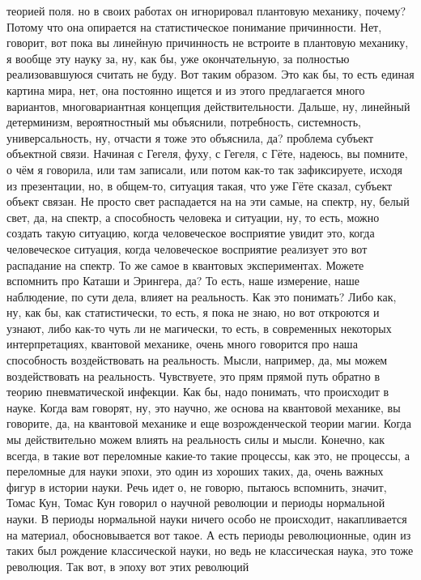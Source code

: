теорией поля. но в своих работах он игнорировал плантовую механику, почему?
Потому что она опирается на статистическое понимание причинности. Нет, говорит,
вот пока вы линейную причинность не встроите в плантовую механику, я вообще эту
науку за, ну, как бы, уже окончательную, за полностью реализовавшуюся считать не
буду. Вот таким образом. Это как бы, то есть единая картина мира, нет, она
постоянно ищется и из этого предлагается много вариантов, многовариантная
концепция действительности. Дальше, ну, линейный детерминизм, вероятностный мы
объяснили, потребность, системность, универсальность, ну, отчасти я тоже это
объяснила, да? проблема субъект объектной связи. Начиная с Гегеля, фуху, с
Гегеля, с Гёте, надеюсь, вы помните, о чём я говорила, или там записали, или
потом как-то так зафиксируете, исходя из презентации, но, в общем-то, ситуация
такая, что уже Гёте сказал, субъект объект связан. Не просто свет распадается на
на эти самые, на спектр, ну, белый свет, да, на спектр, а способность человека и
ситуации, ну, то есть, можно создать такую ситуацию, когда человеческое
восприятие увидит это, когда человеческое ситуация, когда человеческое
восприятие реализует это вот распадание на спектр. То же самое в квантовых
экспериментах. Можете вспомнить про Каташи и Эрингера, да? То есть, наше
измерение, наше наблюдение, по сути дела, влияет на реальность. Как это
понимать? Либо как, ну, как бы, как статистически, то есть, я пока не знаю, но
вот откроются и узнают, либо как-то чуть ли не магически, то есть, в современных
некоторых интерпретациях, квантовой механике, очень много говорится про наша
способность воздействовать на реальность. Мысли, например, да, мы можем
воздействовать на реальность. Чувствуете, это прям прямой путь обратно в теорию
пневматической инфекции. Как бы, надо понимать, что происходит в науке. Когда
вам говорят, ну, это научно, же основа на квантовой механике, вы говорите, да,
на квантовой механике и еще возрожденческой теории магии. Когда мы действительно
можем влиять на реальность силы и мысли. Конечно, как всегда, в такие вот
переломные какие-то такие процессы, как это, не процессы, а переломные для науки
эпохи, это один из хороших таких, да, очень важных фигур в истории науки. Речь
идет о, не говорю, пытаюсь вспомнить, значит, Томас Кун, Томас Кун говорил о
научной революции и периоды нормальной науки. В периоды нормальной науки ничего
особо не происходит, накапливается на материал, обосновывается вот такое. А есть
периоды революционные, один из таких был рождение классической науки, но ведь не
классическая наука, это тоже революция. Так вот, в эпоху вот этих революций
